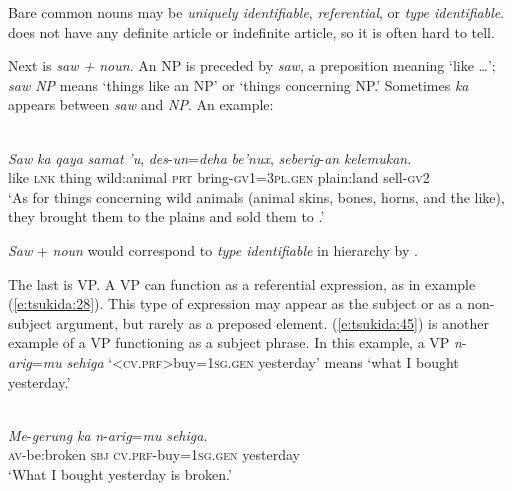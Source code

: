 \documentclass[output=paper
,modfonts
,nonflat]{langsci/langscibook}
\begin{document}
\noindent
Bare common nouns may be \textit{uniquely identifiable}, \textit{referential}, or \textit{type identifiable}.  does not have any definite article or indefinite article, so it is often hard to tell.

Next is \textit{saw + noun}. An NP is preceded by \textit{saw}, a preposition meaning ‘like …’; \textit{saw NP} means ‘things like an NP’ or ‘things concerning NP.’ Sometimes \textit{ka} appears between \textit{saw} and \textit{NP}. An example:

\begin{exe}
	\label{e:tsukida:44}\\
	\gll \textit{Saw} \textit{ka}  \textit{qaya}  \textit{samat} \textit{'u}, \textit{des}-\textit{un}=\textit{deha}  \textit{be'nux},   \textit{seberig}-\textit{an}   \textit{kelemukan}.\\
	like \textsc{lnk} thing wild:animal \textsc{prt} bring-\textsc{gv1}=\textsc{3pl}.\textsc{gen} plain:land  sell-\textsc{gv2} \\
	\glt ‘As for things concerning wild animals (animal skins, bones, horns, and the like), they brought them to the plains and sold them to .’
\end{exe}

\noindent
\textit{Saw} + \textit{noun} would correspond to \textit{type identifiable} in  hierarchy by \citet{Gundel1993}.

The last is VP. A VP can function as a referential expression, as in example (\ref{e:tsukida:28}). This type of expression may appear as the subject or as a non-subject argument, but rarely as a preposed element. (\ref{e:tsukida:45}) is another example of a VP functioning as a subject phrase. In this example, a VP \textit{n}-\textit{arig}=\textit{mu} \textit{sehiga} ‘<\textsc{cv}.\textsc{prf}>buy=\textsc{1sg}.\textsc{gen} yesterday’ means ‘what I bought yesterday.’ 

\begin{exe}
	\label{e:tsukida:45}\\
	\gll \textit{Me}-\textit{gerung}   \textit{ka}   \textit{n}-\textit{arig}=\textit{mu} \textit{sehiga}.\\
	\textsc{av}-be:broken \textsc{sbj} \textsc{cv}.\textsc{prf}-buy=\textsc{1sg}.\textsc{gen} yesterday\\
	\glt ‘What I bought yesterday is broken.’
\end{exe}
\end{document}
